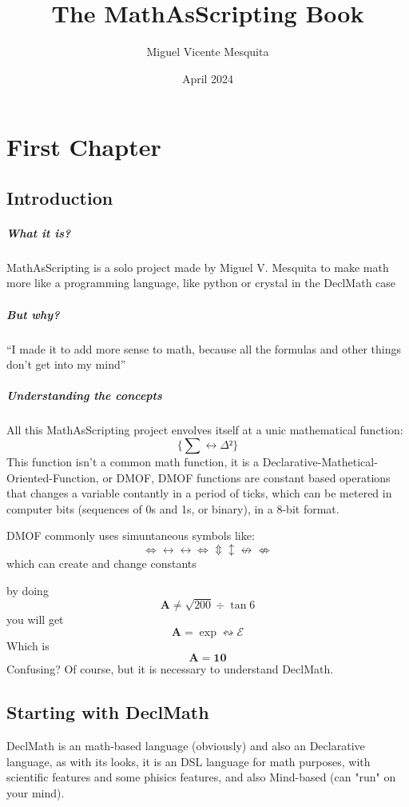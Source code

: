 \documentclass{book}
\title{The MathAsScripting Book}
\author{Miguel Vicente Mesquita}
\date{April 2024}
\begin{document}
\newpage

\chapter{First Chapter}

\section{Introduction}

\paragraph{What it is?}
MathAsScripting is a solo project made by Miguel V. Mesquita to make math more
like a programming language, like python or crystal in the DeclMath case

\paragraph{But why?}
``I made it to add more sense to math, because all the formulas and other things don't get into my mind''

\paragraph{Understanding the concepts}
All this MathAsScripting project envolves itself at a unic mathematical function:
$$
\{ \sum \longleftrightarrow \varDelta² \} 
$$
This function isn't a common math function, it is a Declarative-Mathetical-Oriented-Function, or DMOF,
DMOF functions are constant based operations that changes a variable contantly in a period of ticks,
which can be metered in computer bits (sequences of 0s and 1s, or binary), in a 8-bit format.

DMOF commonly uses simuntaneous symbols like:
$$
\Longleftrightarrow \longleftrightarrow \leftrightarrow \Leftrightarrow \Updownarrow \updownarrow \nleftrightarrow \nLeftrightarrow
$$
which can create and change constants

by doing
$$
\mathbf{A} \neq \sqrt{200} \div \tan{6}
$$
you will get
$$
\mathbf{A} = \exp \leftrightsquigarrow \mathcal{E}
$$
Which is
$$
\mathbf{A} = \mathbf{10} 
$$
Confusing? Of course, but it is necessary to understand DeclMath.

    \section{Starting with DeclMath}
    DeclMath is an math-based language (obviously) and also an Declarative language,
    as with its looks, it is an DSL language for math purposes, with scientific features
    and some phisics features, and also Mind-based (can "run" on your mind).
\end{document}

